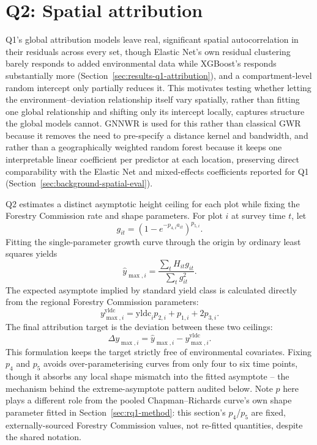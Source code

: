 \section{Q2: Spatial attribution}
\label{sec:rq3-method}
\label{sec:q2-method}

Q1's global attribution models leave real, significant spatial autocorrelation in their residuals across every set, though Elastic Net's own residual clustering barely responds to added environmental data while XGBoost's responds substantially more (Section~\ref{sec:results-q1-attribution}), and a compartment-level random intercept only partially reduces it. This motivates testing whether letting the environment--deviation relationship itself vary spatially, rather than fitting one global relationship and shifting only its intercept locally, captures structure the global models cannot. GNNWR is used for this rather than classical GWR because it removes the need to pre-specify a distance kernel and bandwidth, and rather than a geographically weighted random forest because it keeps one interpretable linear coefficient per predictor at each location, preserving direct comparability with the Elastic Net and mixed-effects coefficients reported for Q1 (Section~\ref{sec:background-spatial-eval}).

Q2 estimates a distinct asymptotic height ceiling for each plot while fixing the Forestry Commission rate and shape parameters. For plot $i$ at survey time $t$, let
\begin{equation}
g_{it}=\left(1-e^{-p_{4,i}a_{it}}\right)^{p_{5,i}}.
\end{equation}
Fitting the single-parameter growth curve through the origin by ordinary least squares yields
\begin{equation}
\hat y_{\max,i}=\frac{\sum_t H_{it}g_{it}}{\sum_t g_{it}^2}.
\label{eq:plot-ymax-fit}
\end{equation}
The expected asymptote implied by standard yield class is calculated directly from the regional Forestry Commission parameters:
\begin{equation}
y_{\max,i}^{\mathrm{yldc}}=\mathrm{yldc}_i p_{2,i}+p_{1,i}+2p_{3,i}.
\end{equation}
The final attribution target is the deviation between these two ceilings:
\begin{equation}
\Delta y_{\max,i}=\hat y_{\max,i}-y_{\max,i}^{\mathrm{yldc}}.
\label{eq:local-ymax-diff}
\end{equation}
This formulation keeps the target strictly free of environmental covariates. Fixing $p_4$ and $p_5$ avoids over-parameterising curves from only four to six time points, though it absorbs any local shape mismatch into the fitted asymptote -- the mechanism behind the extreme-asymptote pattern audited below. Note $p$ here plays a different role from the pooled Chapman--Richards curve's own shape parameter fitted in Section~\ref{sec:rq1-method}: this section's $p_4$/$p_5$ are fixed, externally-sourced Forestry Commission values, not re-fitted quantities, despite the shared notation.

